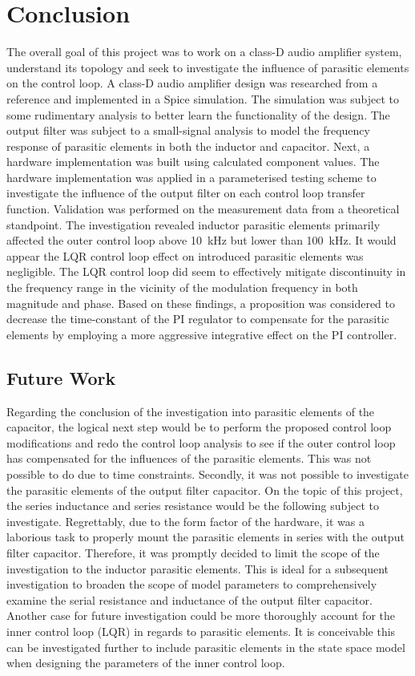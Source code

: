 \chapter[Conclusion]{Conclusion}
The overall goal of this project was to work on a class-D audio amplifier system, understand its topology and seek to investigate the influence of parasitic elements on the control loop. A class-D audio amplifier design was researched from a reference and implemented in a Spice simulation. The simulation was subject to some rudimentary analysis to better learn the functionality of the design. The output filter was subject to a small-signal analysis to model the frequency response of parasitic elements in both the inductor and capacitor. Next, a hardware implementation was built using calculated component values. The hardware implementation was applied in a parameterised testing scheme to investigate the influence of the output filter on each control loop transfer function. Validation was performed on the measurement data from a theoretical standpoint. The investigation revealed inductor parasitic elements primarily affected the outer control loop above \SI{10}{\kilo\hertz} but lower than \SI{100}{\kilo\hertz}. It would appear the LQR control loop effect on introduced parasitic elements was negligible. The LQR control loop did seem to effectively mitigate discontinuity in the frequency range in the vicinity of the modulation frequency in both magnitude and phase.  Based on these findings, a proposition was considered to decrease the time-constant of the PI regulator to compensate for the parasitic elements by employing a more aggressive integrative effect on the PI controller. 

\section[Future Work]{Future Work}
Regarding the conclusion of the investigation into parasitic elements of the capacitor, the logical next step would be to perform the proposed control loop modifications and redo the control loop analysis to see if the outer control loop has compensated for the influences of the parasitic elements. This was not possible to do due to time constraints.
Secondly, it was not possible to investigate the parasitic elements of the output filter capacitor. On the topic of this project, the series inductance and series resistance would be the following subject to investigate. Regrettably, due to the form factor of the hardware, it was a laborious task to properly mount the parasitic elements in series with the output filter capacitor. Therefore, it was promptly decided to limit the scope of the investigation to the inductor parasitic elements. This is ideal for a subsequent investigation to broaden the scope of model parameters to comprehensively examine the serial resistance and inductance of the output filter capacitor.
Another case for future investigation could be more thoroughly account for the inner control loop (LQR) in regards to parasitic elements. It is conceivable this can be investigated further to include parasitic elements in the state space model when designing the parameters of the inner control loop.